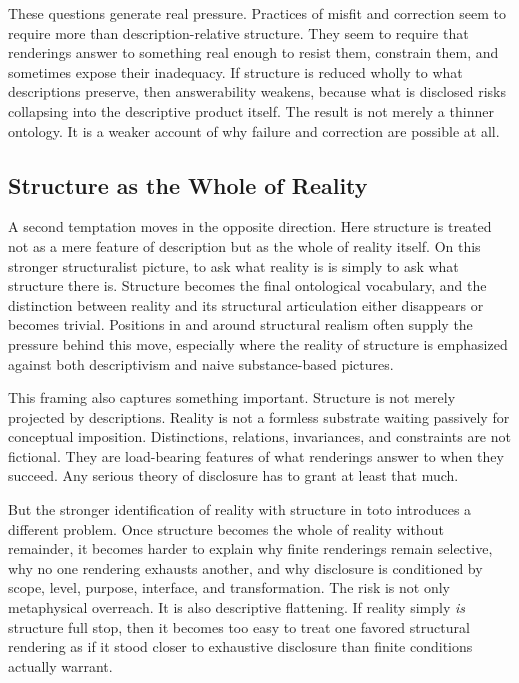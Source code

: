 \documentclass[11pt]{article}
\renewcommand{\emph}[1]{\textit{#1}}
\begin{document}
These questions generate real pressure. Practices of misfit and correction seem to require more than description-relative structure. They seem to require that renderings answer to something real enough to resist them, constrain them, and sometimes expose their inadequacy. If structure is reduced wholly to what descriptions preserve, then answerability weakens, because what is disclosed risks collapsing into the descriptive product itself. The result is not merely a thinner ontology. It is a weaker account of why failure and correction are possible at all.

\subsection{Structure as the Whole of Reality}

A second temptation moves in the opposite direction. Here structure is treated not as a mere feature of description but as the whole of reality itself. On this stronger structuralist picture, to ask what reality is is simply to ask what structure there is. Structure becomes the final ontological vocabulary, and the distinction between reality and its structural articulation either disappears or becomes trivial. Positions in and around structural realism often supply the pressure behind this move, especially where the reality of structure is emphasized against both descriptivism and naive substance-based pictures. \cite{Ladyman1998WhatIsStructuralRealism,Chakravartty2011ScientificRealismSEP}

This framing also captures something important. Structure is not merely projected by descriptions. Reality is not a formless substrate waiting passively for conceptual imposition. Distinctions, relations, invariances, and constraints are not fictional. They are load-bearing features of what renderings answer to when they succeed. Any serious theory of disclosure has to grant at least that much.

But the stronger identification of reality with structure in toto introduces a different problem. Once structure becomes the whole of reality without remainder, it becomes harder to explain why finite renderings remain selective, why no one rendering exhausts another, and why disclosure is conditioned by scope, level, purpose, interface, and transformation. The risk is not only metaphysical overreach. It is also descriptive flattening. If reality simply \emph{is} structure full stop, then it becomes too easy to treat one favored structural rendering as if it stood closer to exhaustive disclosure than finite conditions actually warrant.
\end{document}
